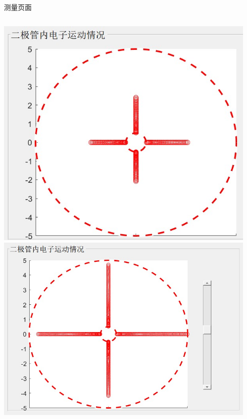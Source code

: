 \documentclass{beamer}
\begin{document}
    \begin{frame}{测量页面}{\thesection \, \secname}
        \begin{columns}
            \begin{column}{0.3\textwidth}
                \includegraphics[scale=0.3]{gallery/move1.jpg}
                \includegraphics[scale=0.3]{gallery/move2.jpg}
            \end{column}
            \begin{column}{0.3\textwidth}

\end{column}
\end{columns}
\end{frame}
\end{document}
